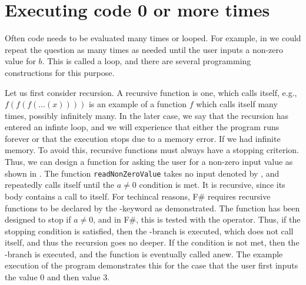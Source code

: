 \documentclass[springer.tex]{subfiles}
\begin{document}
\section{Executing code 0 or more times}
Often code needs to be evaluated many times or looped. For example, in  we could repeat the question as many times as needed until the user inputs a non-zero value for $b$. This is called a loop, and there are several programming constructions for this purpose.

Let us first consider recursion. A recursive function is one, which calls itself, e.g., $f(f(f(\dots(x))))$ is an example of a function $f$ which calls itself many times, possibly infinitely many. In the later case, we say that the recursion has entered an infinte loop, and we will experience that either the program runs forever or that the execution stops due to a memory error. If we had infinite memory. To avoid this, recursive functions must always have a stopping criterion. Thus, we can design a function for asking the user for a non-zero input value as shown in .
% 
%
The function \lstinline{readNonZeroValue} takes no input denoted by \lexeme{()}, and repeatedly calls itself until the $a\neq 0$ condition is met. It is recursive, since its body contains a call to itself. For techincal reasons, F\# requires recursive functions to be declared by the -keyword as demonstrated. The function has been designed to stop if $a\neq 0$, and in F\#, this is tested with the \lexeme{<>} operator. Thus, if the stopping condition is satisfied, then the -branch is executed, which does not call itself, and thus the recursion goes no deeper. If the condition is not met, then the -branch is executed, and the function is eventually called anew. The example execution of the program demonstrates this for the case that the user first inputs the value 0 and then value 3.
\end{document}
